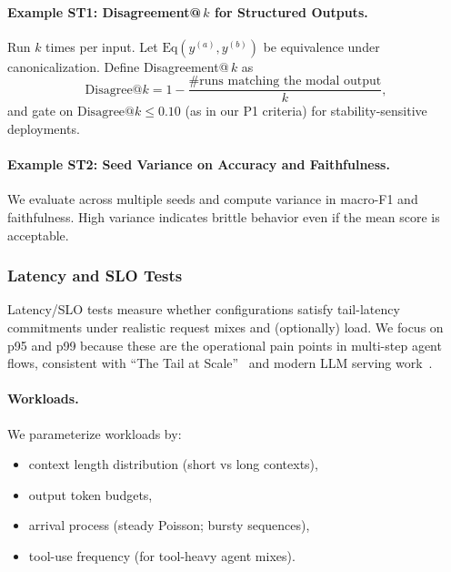\paragraph{Example ST1: Disagreement@\,$k$ for Structured Outputs.}
Run $k$ times per input. Let $\mathrm{Eq}(y^{(a)},y^{(b)})$ be equivalence under canonicalization.
Define Disagreement@\,$k$ as
\[
\mathrm{Disagree}@k = 1 - \frac{\#\text{runs matching the modal output}}{k},
\]
and gate on \(\mathrm{Disagree}@k \le 0.10\) (as in our P1 criteria) for stability-sensitive deployments.

\paragraph{Example ST2: Seed Variance on Accuracy and Faithfulness.}
We evaluate across multiple seeds and compute variance in macro-F1 and faithfulness.
High variance indicates brittle behavior even if the mean score is acceptable.

\subsubsection{Latency and SLO Tests}

Latency/SLO tests measure whether configurations satisfy tail-latency commitments under realistic request mixes and (optionally) load.
We focus on p95 and p99 because these are the operational pain points in multi-step agent flows, consistent with “The Tail at Scale”~\citep{dean2013tail} and modern LLM serving work~\citep{kwon2023vllm,agrawal2024sarathi}.

\paragraph{Workloads.}
We parameterize workloads by:
\begin{itemize}[leftmargin=12pt]
    \item context length distribution (short vs long contexts),
    \item output token budgets,
    \item arrival process (steady Poisson; bursty sequences),
    \item tool-use frequency (for tool-heavy agent mixes).
\end{itemize}

